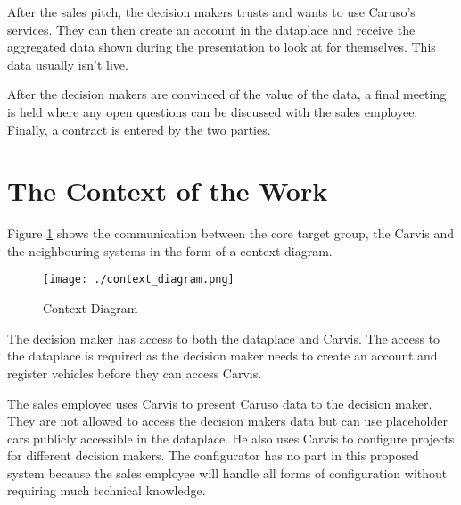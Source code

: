 After the sales pitch, the decision makers trusts and wants to use Caruso's services. They can then create an account in the \gls{dataplace} and receive the aggregated data shown during the presentation to look at for themselves. This data usually isn't live.

After the decision makers are convinced of the value of the data, a final meeting is held where any open questions can be discussed with the sales employee. Finally, a contract is entered by the two parties.

\section{The Context of the Work}
Figure \ref*{ScopeOfWork:ContextDiagram} shows the communication between the core target group, the Carvis and the neighbouring systems in the form of a context diagram.

\begin{figure}[ht]
  \centering
  \texttt{[image: ./context\_diagram.png]}
  \caption{Context Diagram}
  \label{ScopeOfWork:ContextDiagram}
\end{figure}

The decision maker has access to both the \gls{dataplace} and Carvis. The access to the \gls{dataplace} is required as the decision maker needs to create an account and register vehicles before they can access Carvis.

The sales employee uses Carvis to present Caruso data to the decision maker. They are not allowed to access the decision makers data but can use placeholder cars publicly accessible in the \gls{dataplace}. He also uses Carvis to configure projects for different decision makers. The configurator has no part in this proposed system because the sales employee will handle all forms of configuration without requiring much technical knowledge.
